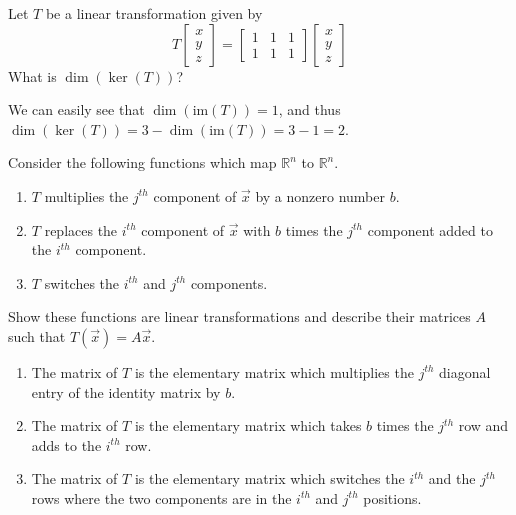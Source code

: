 \documentclass{ximera}
\begin{document}
\begin{problem}\label{prb:10.90}
 Let $T$ be a linear transformation given by
\[
T \left[ \begin{array}{r}
x\\
y \\
z
\end{array}\right] = \left[ \begin{array}{rrr}
1 & 1 & 1 \\
1 & 1 & 1
\end{array}\right]
\left[ \begin{array}{r}
x\\
y \\
z
\end{array}\right]
\]
What is $\dim  ( \ker \left( T \right) )$?

\begin{hint}
We can easily see that $\dim  ( \mbox{im} \left( T \right) ) =1$, and thus
$\dim  ( \ker \left( T \right) ) = 3 - \dim  ( \mbox{im} \left( T \right) ) = 3- 1 = 2$.
\end{hint}
\end{problem}

\begin{problem}\label{prb:10.91} \label{exerlineartransf}
Consider the following functions which map $\mathbb{R}^{n}$ to $\mathbb{R}^{n}$.

\begin{enumerate}
\item $T$ multiplies the $j^{th}$ component of $\vec{x}$ by a nonzero
number $b.$

\item $T$ replaces the $i^{th}$ component of $\vec{x}$ with $b$ times the
$j^{th}$ component added to the $i^{th}$ component.

\item $T$ switches the $i^{th}$ and $j^{th}$ components.
\end{enumerate}

Show these functions are linear transformations and describe their matrices $A$ such that $T\left(\vec{x}\right) = A\vec{x}$.
\begin{hint}
\begin{enumerate}
\item The matrix of $T$ is the elementary matrix which multiplies
the $j^{th}$ diagonal entry of the identity matrix by $b$.
\item The matrix of $T$ is the
elementary matrix which takes $b$ times the $j^{th}$ row and adds to the $%
i^{th}$ row.
\item The matrix of $T$ is the elementary matrix which switches the $%
i^{th}$ and the $j^{th}$ rows where the two components are in the $i^{th}$
and $j^{th}$ positions.
\end{enumerate}
\end{hint}
\end{problem}
\end{document}
